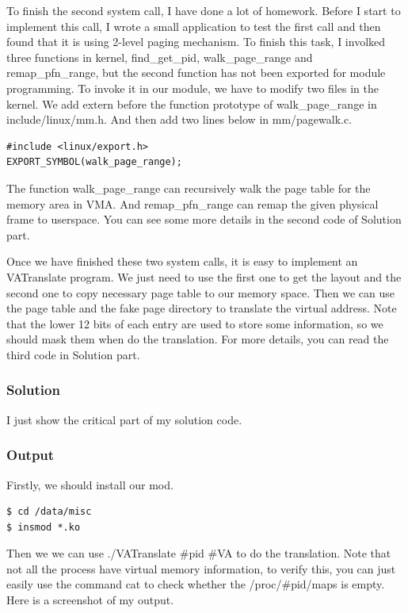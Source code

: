 \documentclass[12pt,a4paper,UTF8]{article}
\theoremstyle{definition}
\numberwithin{equation}{section}
\numberwithin{figure}{section}
\begin{document}
To finish the second system call, I have done a lot of homework. Before I start to implement this call, I wrote a small application to test the first call and then found that it is using 2-level paging mechanism. To finish this task, I involked three functions in kernel, {\color{cyan}\bashfont find\_get\_pid}, {\color{cyan}\bashfont walk\_page\_range} and {\color{cyan}\bashfont remap\_pfn\_range}, but the second function has not been exported for module programming. To invoke it in our module, we have to modify two files in the kernel. We add {\color{cyan}\bashfont extern} before the function prototype of {\color{cyan}\bashfont walk\_page\_range} in {\color{blue}include/linux/mm.h}. And then add two lines below in {\color{blue} mm/pagewalk.c}.
\begin{lstlisting}[style=cmod]
#include <linux/export.h>
EXPORT_SYMBOL(walk_page_range);
\end{lstlisting}
The function {\color{cyan}\bashfont walk\_page\_range} can recursively walk the page table for the memory area in VMA. And {\color{cyan}\bashfont remap\_pfn\_range} can remap the given physical frame to userspace. You can see some more details in the second code of Solution part.

Once we have finished these two system calls, it is easy to implement an VATranslate program. We just need to use the first one to get the layout and the second one to copy necessary page table to our memory space. Then we can use the page table and the fake page directory to translate the virtual address. Note that the lower 12 bits of each entry are used to store some information, so we should mask them when do the translation. For more details, you can read the third code in Solution part.
\subsubsection{Solution}
{\color{red}I just show the critical part of my solution code.}


\newpage


\subsubsection{Output}
Firstly, we should install our mod.
\begin{lstlisting}[style=cmdmod]
$ cd /data/misc
$ insmod *.ko
\end{lstlisting}
Then we we can use {\color{cyan}\bashfont ./VATranslate \#pid \#VA} to do the translation. Note that not all the process have virtual memory information, to verify this, you can just easily use the command {\color{cyan}\bashfont cat} to check whether the {\color{blue} /proc/\#pid/maps} is empty. Here is a screenshot of my output.
\end{document}
